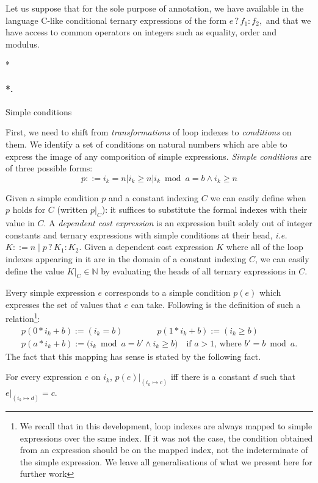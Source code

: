 \documentclass[submission,copyright,creativecommons]{eptcs}
\makeatletter
\theoremstyle{definition}
\newcommand{\tern}[3]{#1\mathrel ? #2 : #3}
\newcommand{\gramm}{\mathrel{::=}}
\newcommand{\ass}{\mathrel{:=}}
\newcommand{\ie}{\emph{i.e.\ }}
\let\oldparagraph\paragraph
\def\paragraph{\@ifnextchar*\new@paragraph@star\new@paragraph}
\def\new@paragraph@star*#1{\oldparagraph*{#1.}}
\def\new@paragraph#1{\oldparagraph{#1.}}
\makeatother
\begin{document}
Let us suppose that for the sole purpose of annotation, we have available in the language C-like conditional ternary expressions of the form $\tern e {f_1}{f_2},$
and that we have access to common operators on integers such as equality, order and modulus.

\paragraph*{Simple conditions}

First, we need to shift from \emph{transformations} of loop indexes to \emph{conditions} on them.
We identify a set of conditions on natural numbers which are able to express the image of any composition of simple expressions.
\emph{Simple conditions} are of three possible forms:
$$ p \gramm  {i_k=n} | {i_k\ge n} | {i_k\bmod a = b\wedge i_k\ge n} $$

Given a simple condition $p$ and a constant indexing $C$ we can easily define when $p$ holds for $C$ (written $p|_C$):
it suffices to substitute the formal indexes with their value in $C$.
A \emph{dependent cost expression} is an expression built solely out of integer constants and ternary expressions with simple conditions at their head, \ie
$K\gramm n \mid \tern p {K_1} {K_2}.$
Given a dependent cost expression $K$ where all of the loop indexes appearing in it are in the domain of a constant indexing $C$, we can easily define the value $K|_C\in \mathbb N$ by evaluating the heads of all
ternary expressions in $C$.

Every simple expression $e$ corresponds to a simple condition $p(e)$ which expresses the set of values that $e$ can take.
Following is the definition of such a relation\footnote{We recall that in this development, loop indexes are always mapped to simple expressions over the same index.
If it was not the case, the condition obtained from an expression should be on the mapped index, not the indeterminate of the simple expression.
We leave all generalisations of what we present here for further work}:
$$
\begin{gathered}
p(0*i_k+b)\ass ({i_k = b})
\qquad\qquad
p(1*i_k+b)\ass ({i_k \ge b})\\
p(a*i_k+b)\ass ({i_k\bmod a = b' \wedge i_k \ge b)}\quad\text{if $a>1$, where $b' = b\bmod a$}.
\end{gathered}
$$
The fact that this mapping has sense is stated by the following fact.
\begin{fact}
\label{fact:simple_conditions_ok}
For every expression $e$ on $i_k$, $p(e)|_{(i_k\mapsto c)}$ iff there is a
constant $d$ such that $e|_{(i_k\mapsto d)}= c$.
\end{fact}
\end{document}

